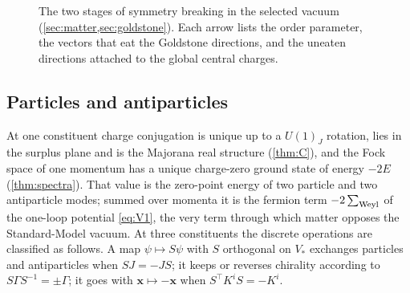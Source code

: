 \begin{figure}[t]
\centering
{}
\caption{The two stages of symmetry breaking in the selected vacuum (\cref{sec:matter,sec:goldstone}). Each arrow lists the order parameter, the vectors that
eat the Goldstone directions, and the uneaten directions attached to the global central charges.}
\label{fig:breaking}
\end{figure}

\subsection{Particles and antiparticles}

At one constituent charge conjugation is unique up to a $U(1)_J$ rotation, lies in the surplus plane and is the Majorana real structure (\cref{thm:C}), and the
Fock space of one momentum has a unique charge-zero ground state of energy $-2E$ (\cref{thm:spectra}). That value is the zero-point energy of two particle and two
antiparticle modes; summed over momenta it is the fermion term $-2\sum_{\rm Weyl}$ of the one-loop potential \eqref{eq:V1}, the very term through which matter
opposes the Standard-Model vacuum. At three constituents the discrete operations are classified as follows. A map $\psi\mapsto S\psi$ with $S$ orthogonal on $V_*$
exchanges particles and antiparticles when $SJ=-JS$; it keeps or reverses chirality according to $S\Gamma S^{-1}=\pm\Gamma$; it goes with $\mathbf x\mapsto-\mathbf x$ when
$S^{\!\top}K^iS=-K^i$.

